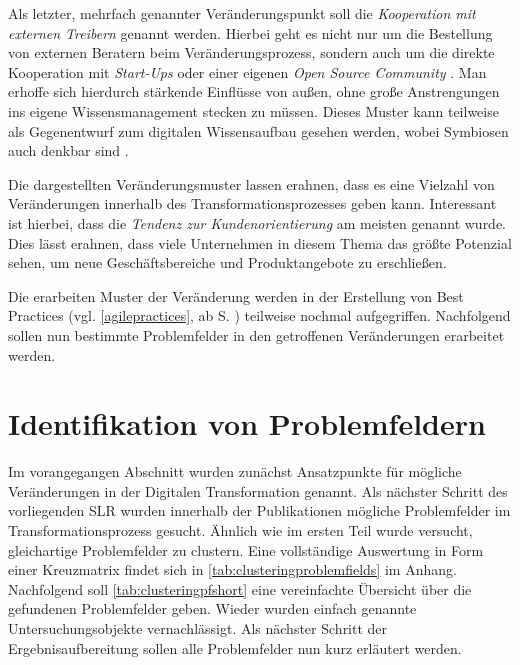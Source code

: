 Als letzter, mehrfach genannter Veränderungspunkt soll die \textit{Kooperation mit externen Treibern} genannt werden. Hierbei geht  es nicht nur um die Bestellung von externen Beratern beim Veränderungsprozess, sondern auch um die direkte Kooperation mit \textit{Start-Ups} oder einer eigenen \textit{Open Source Community} \cite[S. 139]{urbach_digitalization_2018}. Man erhoffe sich hierdurch stärkende Einflüsse von außen, ohne große Anstrengungen ins eigene Wissensmanagement stecken zu müssen. Dieses Muster kann teilweise als Gegenentwurf zum digitalen Wissensaufbau gesehen werden, wobei Symbiosen auch denkbar sind \cite[S. 154]{urbach_digitalization_2018}.

Die dargestellten Veränderungsmuster lassen erahnen, dass es eine Vielzahl von Veränderungen innerhalb des Transformationsprozesses geben kann. Interessant ist hierbei, dass die \textit{Tendenz zur Kundenorientierung} am meisten genannt wurde. Dies lässt erahnen, dass viele Unternehmen in diesem Thema das größte Potenzial sehen, um neue Geschäftsbereiche und Produktangebote zu erschließen.

Die erarbeiten Muster der Veränderung werden in der Erstellung von Best Practices (vgl. \ref{agilepractices}, ab S. \pageref{agilepractices}) teilweise nochmal aufgegriffen. Nachfolgend sollen nun bestimmte Problemfelder in den getroffenen  Veränderungen erarbeitet werden.

\section{Identifikation von Problemfeldern}
\label{problemfields:fields}

Im vorangegangen Abschnitt wurden zunächst Ansatzpunkte für mögliche Veränderungen in der Digitalen Transformation genannt. Als nächster Schritt des vorliegenden SLR wurden innerhalb der Publikationen mögliche Problemfelder im Transformationsprozess gesucht. Ähnlich wie im ersten Teil wurde versucht, gleichartige Problemfelder zu clustern. Eine vollständige Auswertung in Form einer Kreuzmatrix findet sich in \ref{tab:clusteringproblemfields} im Anhang. Nachfolgend soll \ref{tab:clusteringpfshort} eine vereinfachte Übersicht über die gefundenen  Problemfelder geben. Wieder wurden einfach genannte Untersuchungsobjekte vernachlässigt. Als nächster Schritt  der Ergebnisaufbereitung sollen alle Problemfelder nun kurz erläutert werden.

